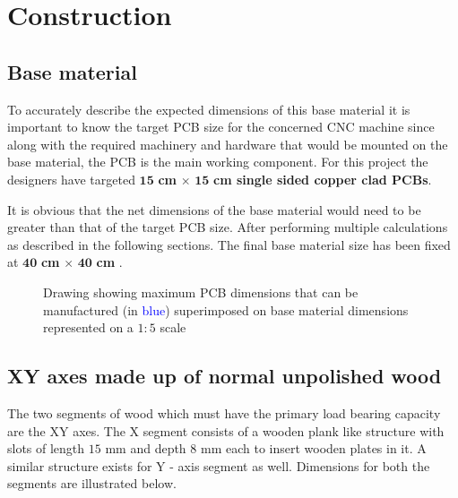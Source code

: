 \chapter{Construction} \label{chapter3}

\section{Base material} \label{bmaterial}

To accurately describe the expected dimensions of this base material it is important to know the target PCB size for the concerned CNC machine since along with the required machinery and hardware that would be mounted on the base material, the PCB is the main working component. For this project the designers have targeted $\boldsymbol{15}$ \textbf{cm} $\boldsymbol{\times}$ $\boldsymbol{15}$ \textbf{cm single sided copper clad PCBs}. \par

It is obvious that the net dimensions of the base material would need to be greater than that of the target PCB size. After performing multiple calculations as described in the following sections. The final base material size has been fixed at $\boldsymbol{40}$ \textbf{cm} $\boldsymbol{\times}$ $\boldsymbol{40}$ \textbf{cm} .

\begin{figure}[h]
 \centering
 \caption{Drawing showing maximum PCB dimensions that can be manufactured (in \textcolor{blue}{blue}) superimposed on base material dimensions represented on a $1:5$ scale}
 \label{fig:base}
\end{figure}


\section{XY axes made up of normal unpolished wood}

The two segments of wood which must have the primary load bearing capacity are the XY axes. The X segment consists of a wooden plank like structure with slots of length $15$ mm and depth $8$ mm each to insert wooden plates in it. A similar structure exists for Y - axis segment as well. Dimensions for both the segments are illustrated below. \par 


